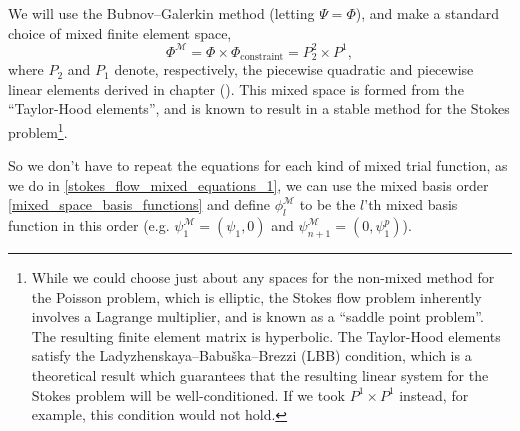 We will use the Bubnov--Galerkin method (letting $\Psi = \Phi$), and make a standard choice of mixed finite element space,
    $$\Phi^\mathcal{M} = \Phi \times \Phi_{\text{constraint}} = P^2_2 \times P^1,$$
where $P_2$ and $P_1$ denote, respectively, the piecewise quadratic and piecewise linear elements derived in chapter ().
This mixed space is formed from the ``Taylor-Hood elements'', and is known to result in a stable method for the Stokes problem\footnote{
While we could choose just about any spaces for the non-mixed method for the Poisson problem, which is elliptic, the Stokes flow problem
inherently involves a Lagrange multiplier, and is known as a ``saddle point problem''. The resulting finite element matrix is hyperbolic.
The Taylor-Hood elements satisfy the Ladyzhenskaya--Babu\v ska--Brezzi (LBB) condition, which
is a theoretical result which guarantees that the resulting linear system for the Stokes problem will be well-conditioned.
If we took $P^1 \times P^1$ instead, for example, this condition would not hold.
}.

So we don't have to repeat the equations for each kind of mixed trial function, as we do in \eqref{stokes_flow_mixed_equations_1}, we can use the mixed basis order \eqref{mixed_space_basis_functions} and define $\phi^\mathcal{M}_l$ to be the $l$'th mixed basis
function in this order (e.g. $\psi^\mathcal{M}_1 = (\psi_1, 0)$ and $\psi^\mathcal{M}_{n+1} = (0, \psi^p_1)$).


